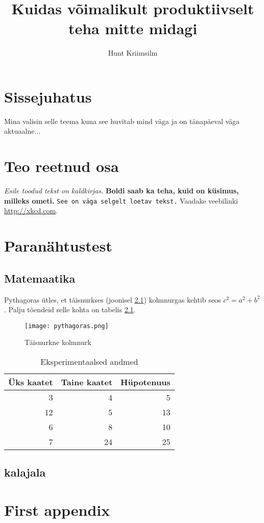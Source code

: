 \documentclass{trkuur} %
\title{Kuidas võimalikult produktiivselt \\ teha mitte midagi} %
\author{Hunt Kriimsilm}
\begin{document}
\maketitle
\tableofcontents

\chapter*{Sissejuhatus}
Mina valisin selle teema kuna see huvitab mind väga ja on tänapäeval väga aktuaalne...

\chapter{Teo reetnud osa}
\emph{Esile toodud tekst on kaldkirjas.}
\textbf{Boldi saab ka teha, kuid on küsimus, milleks ometi.}
\texttt{See on väga selgelt loetav tekst.}
Vaadake veebilinki \url{http://xkcd.com}.

\chapter{Paranähtustest}
\section{Matemaatika}
Pythagoras ütles, et täisnurkses (joonisel \ref{taisk}) kolmnurgas kehtib seos $c^2 = a^2 + b^2$. Palju tõendeid selle kohta on tabelis \ref{pythtabel}.

\begin{figure}[h]
	\texttt{[image: pythagoras.png]}
	\caption{Täisnurkne kolmnurk}
	\label{taisk} %
\end{figure}


\begin{table}[h]
	\caption{Eksperimentaalsed andmed}
	\label{pythtabel}
	\begin{tabular}{rr|r} %
		Üks kaatet & Taine kaatet & Hüpotenuus  \\
		\hline
		3   &  4   &  5    \\
		12  &  5   &  13   \\
		6   &  8   &  10   \\
		7   &  24  &  25
	\end{tabular}
\end{table}

\section{kalajala}

\printbibliography

\appendix
\chapter{First appendix}
\cite{wiki}
\end{document}
